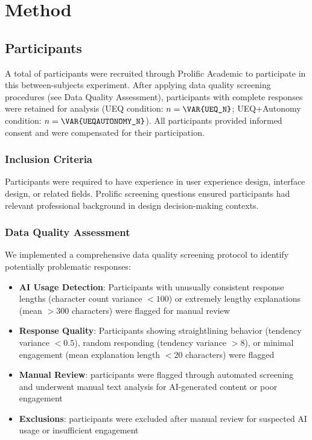 
\section{Method}

\subsection{Participants}
A total of \texttt{} participants were recruited through Prolific Academic to participate in this between-subjects experiment. After applying data quality screening procedures (see Data Quality Assessment), \texttt{} participants with complete responses were retained for analysis (UEQ condition: $n = \texttt{\VAR{UEQ\_N}}$; UEQ+Autonomy condition: $n = \texttt{\VAR{UEQAUTONOMY\_N}}$). All participants provided informed consent and were compensated \texttt{} for their participation.

\subsubsection{Inclusion Criteria}
Participants were required to have experience in user experience design, interface design, or related fields. Prolific screening questions ensured participants had relevant professional background in design decision-making contexts.

\subsubsection{Data Quality Assessment}
We implemented a comprehensive data quality screening protocol to identify potentially problematic responses:

\begin{itemize}
    \item \textbf{AI Usage Detection}: Participants with unusually consistent response lengths (character count variance $< 100$) or extremely lengthy explanations (mean $> 300$ characters) were flagged for manual review
    \item \textbf{Response Quality}: Participants showing straightlining behavior (tendency variance $< 0.5$), random responding (tendency variance $> 8$), or minimal engagement (mean explanation length $< 20$ characters) were flagged
    \item \textbf{Manual Review}: \texttt{} participants were flagged through automated screening and underwent manual text analysis for AI-generated content or poor engagement
    \item \textbf{Exclusions}: \texttt{} participants were excluded after manual review for suspected AI usage or insufficient engagement
\end{itemize}

